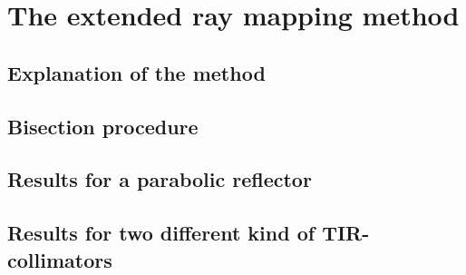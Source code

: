\chapter{The extended ray mapping method}


\section{Explanation of the method}
\section{Bisection procedure}
\section{Results for a parabolic reflector}
\section{Results for two different kind of TIR-collimators}